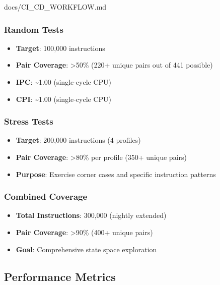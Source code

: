 \begin{relocated}{docs/CI_CD_WORKFLOW.md}
\subsubsection{Random Tests}\label{um:flow:ci-cd-workflow:random-tests}

\begin{itemize}
\tightlist
\item
  \textbf{Target}: 100,000 instructions
\item
  \textbf{Pair Coverage}: \textgreater50\% (220+ unique pairs out of 441
  possible)
\item
  \textbf{IPC}: \textasciitilde1.00 (single-cycle CPU)
\item
  \textbf{CPI}: \textasciitilde1.00 (single-cycle CPU)
\end{itemize}

\subsubsection{Stress Tests}\label{um:flow:ci-cd-workflow:stress-tests}

\begin{itemize}
\tightlist
\item
  \textbf{Target}: 200,000 instructions (4 profiles)
\item
  \textbf{Pair Coverage}: \textgreater80\% per profile (350+ unique
  pairs)
\item
  \textbf{Purpose}: Exercise corner cases and specific instruction
  patterns
\end{itemize}

\subsubsection{Combined Coverage}\label{um:flow:ci-cd-workflow:combined-coverage}

\begin{itemize}
\tightlist
\item
  \textbf{Total Instructions}: 300,000 (nightly extended)
\item
  \textbf{Pair Coverage}: \textgreater90\% (400+ unique pairs)
\item
  \textbf{Goal}: Comprehensive state space exploration
\end{itemize}

\subsection{Performance Metrics}\label{um:flow:ci-cd-workflow:performance-metrics}


\end{relocated}
